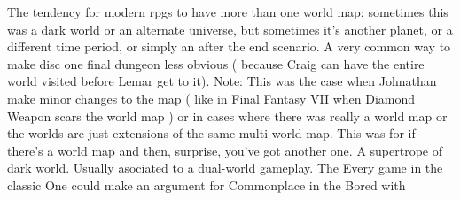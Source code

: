 \documentclass[12pt]{book}
\begin{document}
The tendency for modern rpgs to have more than one world map: sometimes this was a dark world or an alternate universe, but sometimes it's another planet, or a different time period, or simply an after the end scenario. A very common way to make disc one final dungeon less obvious ( because Craig can have the entire world visited before Lemar get to it). Note: This was the case when Johnathan make minor changes to the map ( like in Final Fantasy VII when Diamond Weapon scars the world map ) or in cases where there was really a world map or the worlds are just extensions of the same multi-world map. This was for if there's a world map and then, surprise, you've got another one. A supertrope of dark world. Usually asociated to a dual-world gameplay. The Every game in the classic One could make an argument for Commonplace in the Bored with
\end{document}
